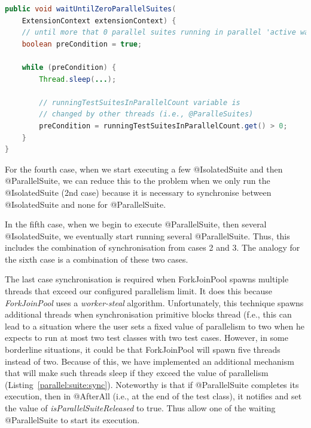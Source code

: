 \begin{lstlisting}[language=Java,label=parallelsuite:isolatedsuite:sync,caption=@ParallelSuite and @IsolatedSuite synchronisation mechanism,frame=tb]
public void waitUntilZeroParallelSuites(
    ExtensionContext extensionContext) {
    // until more that 0 parallel suites running in parallel 'active waiting'
    boolean preCondition = true;

    while (preCondition) {
        Thread.sleep(...);

        // runningTestSuitesInParallelCount variable is
        // changed by other threads (i.e., @ParalleSuites)
        preCondition = runningTestSuitesInParallelCount.get() > 0;
    }
}
\end{lstlisting}

For the fourth case, when we start executing a few @IsolatedSuite and then @ParallelSuite, we can reduce this to the
problem when we only run the @IsolatedSuite (2nd case) because it is necessary to synchronise between @IsolatedSuite
and none for @ParallelSuite.

In the fifth case, when we begin to execute @ParallelSuite, then several @IsolatedSuite, we eventually start running several
@ParallelSuite. Thus, this includes the combination of synchronisation from cases 2 and 3.
The analogy for the sixth case is a combination of these two cases.

The last case synchronisation is required when ForkJoinPool spawns multiple threads that exceed our configured parallelism limit.
It does this because \emph{ForkJoinPool} uses a \emph{worker-steal} algorithm. Unfortunately, this technique spawns additional threads when
synchronisation primitive blocks thread (f.e., this can lead to a situation where the user sets a fixed value of parallelism
to two when he expects to run at most two test classes with two test cases. However, in some borderline situations,
it could be that ForkJoinPool will spawn five threads instead of two. Because of this, we have implemented an additional
mechanism that will make such threads sleep if they exceed the value of parallelism (Listing~\ref{parallel:suite:sync}).
Noteworthy is that if @ParallelSuite completes its execution, then in @AfterAll (i.e., at the end of the test class),
it notifies and set the value of \emph{isParallelSuiteReleased} to true. Thus allow one of the waiting @ParallelSuite to start its execution.

